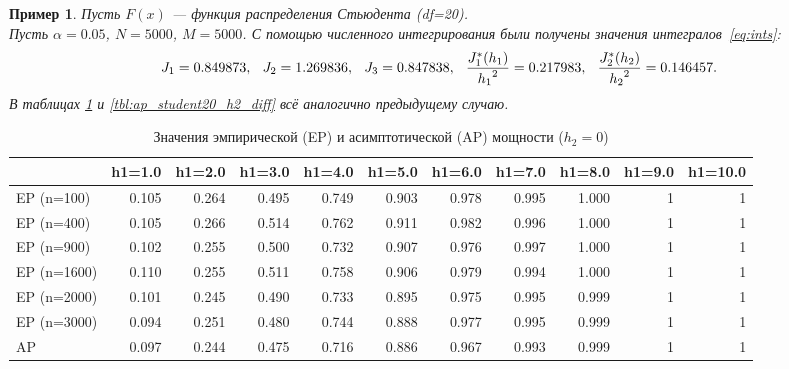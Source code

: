\documentclass[12pt]{article}
\theoremstyle{break}
\newtheorem{example}{Пример}
\begin{document}
\newpage

\begin{example}
	Пусть $F(x)$ --- функция распределения Стьюдента (df=20).\\
	Пусть $\alpha = 0.05$, $N=5000$, $M=5000$.
	С помощью численного интегрирования были получены значения интегралов~\eqref{eq:ints}:
	\begin{equation*}
		J_1 = 0.849873, \hspace{0.1in} J_2 = 1.269836, \hspace{0.1in}  J_3=0.847838, \hspace{0.1in}
		\frac{J^{*}_1(h_1)}{{h_1}^2} = 0.217983,   \hspace{0.1in} \frac{J^{*}_2(h_2)}{{h_2}^2} = 0.146457.
	\end{equation*}
	В таблицах  \ref{tbl:ap_student20_h1_diff} и \ref{tbl:ap_student20_h2_diff} всё аналогично предыдущему случаю.
\end{example}


\begin{table}[!h]
	\centering
	\caption{Значения эмпирической (EP) и асимптотической (AP) мощности ($h_2=0$)}
	\centering
	\hspace*{-1.0cm}\begin{tabular}
		[t]{lrrrrrrrrrr}
		\toprule
		& h1=1.0 & h1=2.0 & h1=3.0 & h1=4.0 & h1=5.0 & h1=6.0 & h1=7.0 & h1=8.0 & h1=9.0 & h1=10.0\\
		\midrule
		EP (n=100) & 0.105 & 0.264 & 0.495 & 0.749 & 0.903 & 0.978 & 0.995 & 1.000 & 1 & 1\\
		EP (n=400) & 0.105 & 0.266 & 0.514 & 0.762 & 0.911 & 0.982 & 0.996 & 1.000 & 1 & 1\\
		EP (n=900) & 0.102 & 0.255 & 0.500 & 0.732 & 0.907 & 0.976 & 0.997 & 1.000 & 1 & 1\\
		EP (n=1600) & 0.110 & 0.255 & 0.511 & 0.758 & 0.906 & 0.979 & 0.994 & 1.000 & 1 & 1\\
		EP (n=2000) & 0.101 & 0.245 & 0.490 & 0.733 & 0.895 & 0.975 & 0.995 & 0.999 & 1 & 1\\
		
		EP (n=3000) & 0.094 & 0.251 & 0.480 & 0.744 & 0.888 & 0.977 & 0.995 & 0.999 & 1 & 1\\
		\addlinespace
		AP & 0.097 & 0.244 & 0.475 & 0.716 & 0.886 & 0.967 & 0.993 & 0.999 & 1 & 1\\
		\bottomrule
	\end{tabular}
	\label{tbl:ap_student20_h1_diff}
\end{table}
\end{document}
